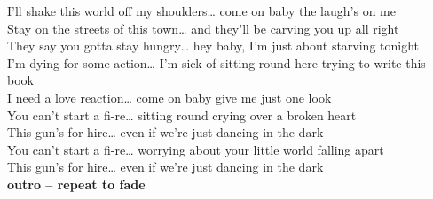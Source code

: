 I'll shake this world off my shoulders…  come on baby the laugh's on me\\
 Stay on the streets of this town…  and they'll be carving you up all right\\
They say you gotta stay hungry…  hey baby, I'm just about starving tonight\\
I'm dying for some action…  I'm sick of sitting round here trying to write this book\\
I need a love reaction…  come on baby give me just one look\\
You can't start a fi-re… sitting round crying over a broken heart\\
This gun's for hire…  even if we're just dancing in the dark\\
You can't start a fi-re… worrying about your little world falling apart\\
This gun's for hire…  even if we're just dancing in the  dark\\
\textbf{outro – repeat to fade}    
